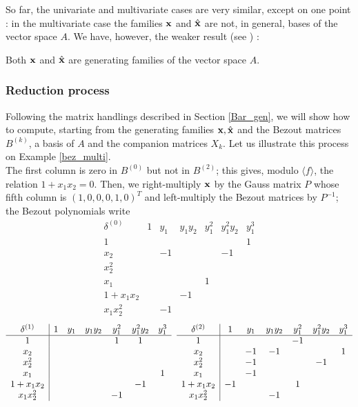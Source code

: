 \documentclass{standalone}
\begin{document}
So far, the univariate and multivariate cases are very similar, except on one point : in the multivariate case the families $\bold{x}$ and $\hat{\bold{x}}$ are not, in general, bases of the vector space $A$. We have, however, the weaker result (see \cite{jpc}) :

\begin{prop}
Both $\bold{x}$ and $\hat{\bold{x}}$ are generating families of the vector space $A$.
\end{prop}

\subsubsection{Reduction process}
\label{sec:reduction_process}
Following the matrix handlings described in Section \ref{Bar_gen}, we will show how to compute, starting from the generating families $\bold{x}, \hat{\bold{x}}$ and the Bezout matrices $B^{(k)}$, a basis of $A$ and the companion matrices $X_k$.
Let us illustrate this process on Example \ref{bez_multi}.\\
The first column is zero in $B^{(0)}$ but not in $B^{(2)}$; this gives, modulo $\langle f \rangle$, the relation $1 + x_1x_2 = 0$. Then, we right-multiply $\bold{x}$ by the Gauss matrix $P$ whose fifth column is $(1, 0, 0, 0, 1, 0)^{T}$ and left-multiply the Bezout matrices by $P^{-1}$; the Bezout polynomials write 
$$
\begin{array}{c|cccccc}
	\delta^{(0)} & 1 & y_1 & y_1y_2 & y_1^2 & y_1^2y_2 & y_1^3 \\
	\hline
	1 &  &  &  &  &  & 1\\
	x_2 &  & -1 &  &  & -1 & \\
	x_2^2 &  &  &  &  &  & \\
	x_1 &  &  &  & 1 &  & \\
	1+x_1x_2 &  &  & -1 &  &  & \\
	x_1x_2^2 &  & -1 &  &  &  &
\end{array}$$
$$
\begin{array}{c|cccccc}
	\delta^{(1)} & 1 & y_1 & y_1y_2 & y_1^2 & y_1^2y_2 & y_1^3 \\
	\hline
	1 &  &  &  & 1 & 1 & \\
	x_2 &  &  &  &  &  & \\
	x_2^2 &  &  &  &  &  & \\
	x_1 &  &  &  &  &  & 1\\
	1+x_1x_2 &  &  &  &  & -1 & \\
	x_1x_2^2 &  &  &  & -1 &  &
\end{array}
\hspace{0.2cm}
\begin{array}{c|cccccc}
	\delta^{(2)} & 1 & y_1 & y_1y_2 & y_1^2 & y_1^2y_2 & y_1^3 \\
	\hline
	1 &  &  &  & -1 &  & \\
	x_2 &  & -1 & -1 &  &  & 1\\
	x_2^2 &  & -1 &  &  & -1 & \\
	x_1 &  & -1 &  &  &  & \\
	1+x_1x_2 & -1 &  &  & 1 &  & \\
	x_1x_2^2 &  &  & -1 &  &  &
\end{array}
$$
\end{document}
